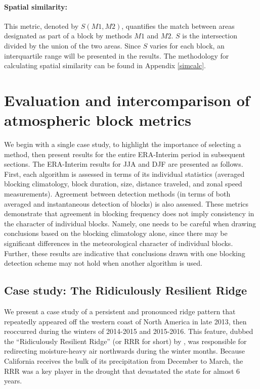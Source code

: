 \documentclass[smallextended]{svjour3}       %
\numberwithin{equation}{section}
\begin{document}
\paragraph{Spatial similarity:} This metric, denoted by $S(M1,M2)$, quantifies the match between areas designated as part of a block by methods $M1$ and $M2$. $S$ is the intersection divided by the union of the two areas. Since $S$ varies for each block, an interquartile range will be presented in the results. The methodology for calculating spatial similarity can be found in Appendix \ref{simcalc}. 


\section{Evaluation and intercomparison of atmospheric block metrics}\label{results}

We begin with a single case study, to highlight the importance of selecting a method, then present results for the entire ERA-Interim period in subsequent sections. The ERA-Interim results for JJA and DJF are presented as follows. First, each algorithm is assessed in terms of its individual statistics (averaged blocking climatology, block duration, size, distance traveled, and zonal speed measurements). Agreement between detection methods (in terms of both averaged and instantaneous detection of blocks) is also assessed. 
These metrics demonstrate that agreement in blocking frequency does not imply consistency in the character of individual blocks.  Namely, one needs to be careful when drawing conclusions based on the blocking climatology alone, since there may be significant differences in the meteorological character of individual blocks.  Further, these results are indicative that conclusions drawn with one blocking detection scheme may not hold when another algorithm is used.

\subsection{Case study: The Ridiculously Resilient Ridge}\label{rrrsec}


We present a case study of a persistent and pronounced ridge pattern that repeatedly appeared off the western coast of North America in late 2013, then reoccurred during the winters of 2014-2015 and 2015-2016. This feature, dubbed the ``Ridiculously Resilient Ridge'' (or RRR for short) by \cite{swain_extraordinary_2014}, was responsible for redirecting moisture-heavy air northwards during the winter months. Because California receives the bulk of its precipitation from December to March, the RRR was a key player in the drought that devastated the state for almost 6 years. 
\end{document}
